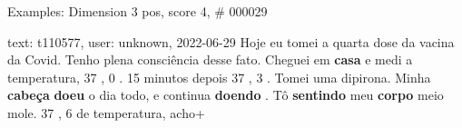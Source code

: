 \begin{frame}{Examples: Dimension 3 pos, score 4, \# 000029}
\footnotesize
\begin{exampleblock}{text: t110577, user: unknown, 2022-06-29}
Hoje eu tomei a quarta dose da vacina da Covid. Tenho plena consciência desse 
fato. Cheguei em \textbf{casa} e medi a temperatura, 37 , 0 . 15 minutos depois 
37 , 3 . Tomei uma dipirona. Minha \textbf{cabeça} \textbf{doeu} o dia todo, e 
continua \textbf{doendo} . Tô \textbf{sentindo} meu \textbf{corpo} meio mole. 
37 , 6 de temperatura, acho+ 
\end{exampleblock}
\end{frame}
